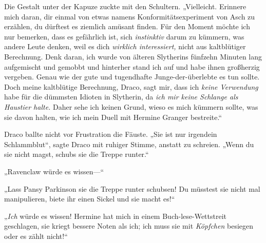 Die Gestalt unter der Kapuze zuckte mit den Schultern. „Vielleicht. Erinnere mich daran, dir einmal von etwas namens Konformitätsexperiment von Asch zu erzählen, du dürftest es ziemlich amüsant finden. Für den Moment möchte ich nur bemerken, dass es gefährlich ist, sich \emph{instinktiv} darum zu kümmern, was andere Leute denken, weil es dich \emph{wirklich interessiert,} nicht aus kaltblütiger Berechnung. Denk daran, ich wurde von älteren Slytherins fünfzehn Minuten lang aufgemischt und gemobbt und hinterher stand ich auf und habe ihnen großherzig vergeben. Genau wie der gute und tugendhafte Junge-der-überlebte es tun sollte. Doch meine kaltblütige Berechnung, Draco, sagt mir, dass ich \emph{keine Verwendung} habe für die dümmsten Idioten in Slytherin, da \emph{ich mir keine Schlange als Haustier halte.} Daher sehe ich keinen Grund, wieso es mich kümmern sollte, was sie davon halten, wie ich mein Duell mit Hermine Granger bestreite.“

Draco ballte nicht vor Frustration die Fäuste. „Sie ist nur irgendein Schlammblut“, sagte Draco mit ruhiger Stimme, anstatt zu schreien. „Wenn du sie nicht magst, schubs sie die Treppe runter.“

„Ravenclaw würde es wissen—“

„Lass Pansy Parkinson sie die Treppe runter schubsen! Du müsstest sie nicht mal manipulieren, biete ihr einen Sickel und sie macht es!“

„\emph{Ich} würde es wissen! Hermine hat mich in einem Buch-lese-Wettstreit geschlagen, sie kriegt bessere Noten als ich; ich muss sie mit \emph{Köpfchen} besiegen oder es zählt nicht!“

